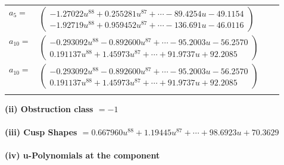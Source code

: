 \documentclass[1p]{elsarticle_modified}
\theoremstyle{definition}
\begin{document}
\begin{tabular}{m{7pt} m{180pt} m{7pt} m{180pt} }
\flushright $a_{5}=$&$\begin{pmatrix}-1.27022 u^{88}+0.255281 u^{87}+\cdots-89.4254 u-49.1154\\-1.92719 u^{88}+0.959452 u^{87}+\cdots-136.691 u-46.0116\end{pmatrix}$ \\
\flushright $a_{10}=$&$\begin{pmatrix}-0.293092 u^{88}-0.892600 u^{87}+\cdots-95.2003 u-56.2570\\0.191137 u^{88}+1.45973 u^{87}+\cdots+91.9737 u+92.2085\end{pmatrix}$\\ \flushright $a_{10}=$&$\begin{pmatrix}-0.293092 u^{88}-0.892600 u^{87}+\cdots-95.2003 u-56.2570\\0.191137 u^{88}+1.45973 u^{87}+\cdots+91.9737 u+92.2085\end{pmatrix}$\\&\end{tabular}
\flushleft \textbf{(ii) Obstruction class $= -1$}\\~\\
\flushleft \textbf{(iii) Cusp Shapes $= 0.667960 u^{88}+1.19445 u^{87}+\cdots+98.6923 u+70.3629$}\\~\\
\newpage\renewcommand{\arraystretch}{1}
\flushleft \textbf{(iv) u-Polynomials at the component}\newline \\
\end{document}
